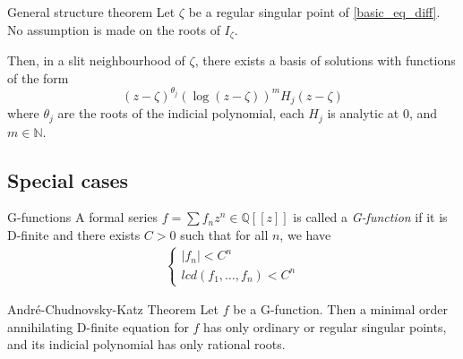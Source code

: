 \documentclass[../main.tex]{subfiles}
\begin{document}
\begin{thm}{General structure theorem}
	Let $\zeta$ be a regular singular point of \eqref{basic_eq_diff}. No assumption is made on the roots of $I_\zeta$.
	
	Then, in a slit neighbourhood of $\zeta$, there exists a basis of solutions with functions of the form
	\begin{equation}\label{general_structure_form}
	{(z - \zeta)}^{\theta_j} {(\log (z - \zeta))}^m H_j (z - \zeta)
	\end{equation}
	where $\theta_j$ are the roots of the indicial polynomial, each $H_j$ is analytic at 0, and $m \in \mathbb{N}$. 
\end{thm}

\subsection{Special cases}

\begin{definition}{G-functions}
	A formal series $f = \sum f_n z^n \in \mathbb{Q}[[z]]$ is called a \emph{G-function} if it is D-finite and there exists $C > 0$ such that for all $n$, we have
	\begin{align*}
	\begin{cases}
	|f_n| < C^n\\
	lcd(f_1, \dots, f_n) < C^n
	\end{cases}
	\end{align*}	
\end{definition}

\begin{thm}{André-Chudnovsky-Katz Theorem}
	Let $f$ be a G-function. Then a minimal order annihilating D-finite equation for $f$ has only ordinary or regular singular points, and its indicial polynomial has only rational roots.
\end{thm}




\end{document}
